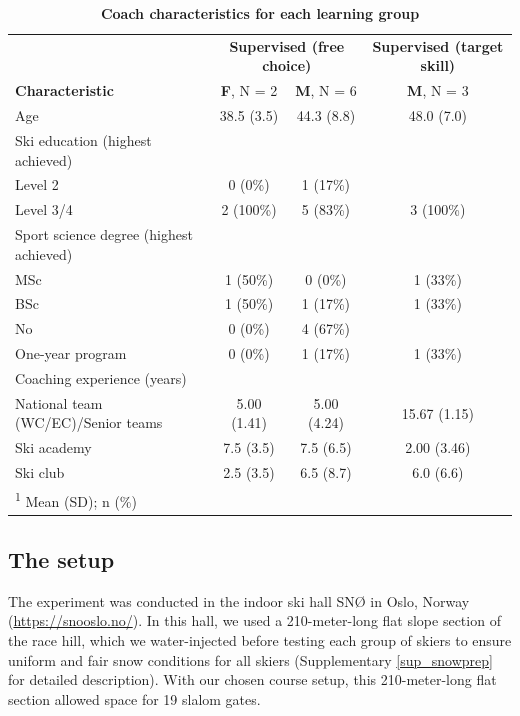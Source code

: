 \documentclass[pdflatex,sn-nature]{sn-jnl}%
\theoremstyle{thmstyleone}%
\theoremstyle{thmstyletwo}%
\theoremstyle{thmstylethree}%
\begin{document}
\begin{table}\label{descriptive_coach}
\caption{\textbf{Coach characteristics for each learning group}}
\centering
\begin{tabular}[H]{l|c|c|c}
\hline
\multicolumn{1}{c|}{ } & \multicolumn{2}{c|}{\textbf{Supervised (free choice)}} & \multicolumn{1}{c}{\textbf{Supervised (target skill)}} \\
\textbf{Characteristic} & \textbf{F}, N = 2 & \textbf{M}, N = 6 & \textbf{M}, N = 3\\
\hline
Age & 38.5 (3.5) & 44.3 (8.8) & 48.0 (7.0)\\
\hline
Ski education (highest achieved) &  &  & \\
\hline
\hspace{1em}Level 2 & 0 (0\%) & 1 (17\%) & \\
\hline
\hspace{1em}Level 3/4 & 2 (100\%) & 5 (83\%) & 3 (100\%)\\
\hline
Sport science degree (highest achieved) &  &  & \\
\hline
\hspace{1em}MSc & 1 (50\%) & 0 (0\%) & 1 (33\%)\\
\hline
\hspace{1em}BSc & 1 (50\%) & 1 (17\%) & 1 (33\%)\\
\hline
\hspace{1em}No & 0 (0\%) & 4 (67\%) & \\
\hline
\hspace{1em}One-year program & 0 (0\%) & 1 (17\%) & 1 (33\%)\\
\hline
Coaching experience (years) &  &  & \\
\hline
\hspace{1em}National team (WC/EC)/Senior teams & 5.00 (1.41) & 5.00 (4.24) & 15.67 (1.15)\\
\hline
\hspace{1em}Ski academy & 7.5 (3.5) & 7.5 (6.5) & 2.00 (3.46)\\
\hline
\hspace{1em}Ski club & 2.5 (3.5) & 6.5 (8.7) & 6.0 (6.6)\\
\hline
\multicolumn{4}{l}{\rule{0pt}{1em}\textsuperscript{1} Mean (SD); n (\%)}\\
\end{tabular}
\end{table} 


\subsection{The setup}
The experiment was conducted in the indoor ski hall SNØ in Oslo, Norway (\url{https://snooslo.no/}). In this hall, we used a 210-meter-long flat slope section of the race hill, which we water-injected before testing each group of skiers to ensure uniform and fair snow conditions for all skiers (Supplementary \ref{sup_snowprep} for detailed description). With our chosen course setup, this 210-meter-long flat section allowed space for 19 slalom gates. 
\end{document}
